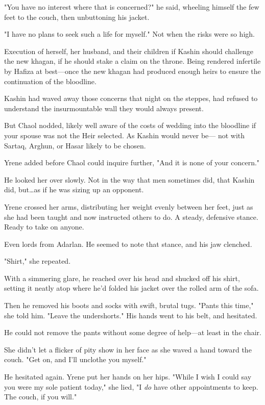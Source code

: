 "You have no interest where that is concerned?"
he said, wheeling himself the few feet to the couch, then unbuttoning his jacket.

"I have no plans to seek such a life for myself."
Not when the risks were so high.

Execution of herself, her husband, and their children if Kashin should challenge the new khagan, if he should stake a claim on the throne.
Being rendered infertile by Hafiza at best---once the new khagan had produced enough heirs to ensure the continuation of the bloodline.

Kashin had waved away those concerns that night on the steppes, had refused to understand the insurmountable wall they would always present.

But Chaol nodded, likely well aware of the costs of wedding into the bloodline if your spouse was not the Heir selected.
As Kashin would never be--- not with Sartaq, Arghun, or Hasar likely to be chosen.

Yrene added before Chaol could inquire further, "And it is none of your concern."

He looked her over slowly.
Not in the way that men sometimes did, that Kashin did, but\ldots as if he was sizing up an opponent.

Yrene crossed her arms, distributing her weight evenly between her feet, just as she had been taught and now instructed others to do.
A steady, defensive stance.
Ready to take on anyone.

Even lords from Adarlan.
He seemed to note that stance, and his jaw clenched.

"Shirt," she repeated.

With a simmering glare, he reached over his head and shucked off his shirt, setting it neatly atop where he'd folded his jacket over the rolled arm of the sofa.

Then he removed his boots and socks with swift, brutal tugs.
"Pants this time," she told him.
"Leave the undershorts."
His hands went to his belt, and hesitated.

He could not remove the pants without some degree of help---at least in the chair.

She didn't let a flicker of pity show in her face as she waved a hand toward the couch.
"Get on, and I'll unclothe you myself."

He hesitated again.
Yrene put her hands on her hips.
"While I wish I could say you were my sole patient today," she lied, "I \emph{do} have other appointments to keep.
The couch, if you will."

